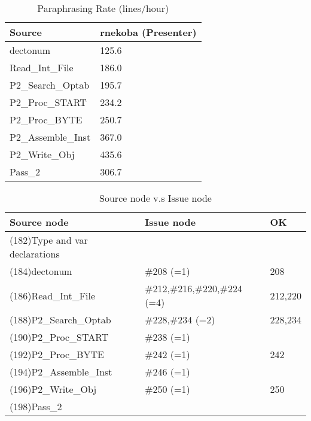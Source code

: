 \begin{table}[hb]
\begin{center}
\begin{tabular}{|l|l|}
\hline
Source & rnekoba (Presenter)\\
\hline
dectonum & 125.6\\
Read\_Int\_File & 186.0\\
P2\_Search\_Optab & 195.7\\
P2\_Proc\_START & 234.2\\
P2\_Proc\_BYTE & 250.7\\
P2\_Assemble\_Inst & 367.0\\
P2\_Write\_Obj & 435.6\\
Pass\_2 & 306.7\\
\hline
\end{tabular}
\end{center}
\caption{Paraphrasing Rate (lines/hour)}
\end{table}


\begin{table}[hb]
\begin{center}
\begin{tabular}{|l|l|l|}
\hline
Source node & Issue node  & OK\\
\hline
(182)Type and var declarations &  & \\
(184)dectonum & \#208 (=1) & 208\\
(186)Read\_Int\_File & \#212,\#216,\#220,\#224 (=4) & 212,220\\
(188)P2\_Search\_Optab & \#228,\#234 (=2) & 228,234\\
(190)P2\_Proc\_START & \#238 (=1) & \\
(192)P2\_Proc\_BYTE & \#242 (=1) & 242\\
(194)P2\_Assemble\_Inst & \#246 (=1) & \\
(196)P2\_Write\_Obj & \#250 (=1) & 250\\
(198)Pass\_2 &  & \\
\hline
\end{tabular}
\caption{Source node v.s Issue node}
\end{center}
\end{table}

%
